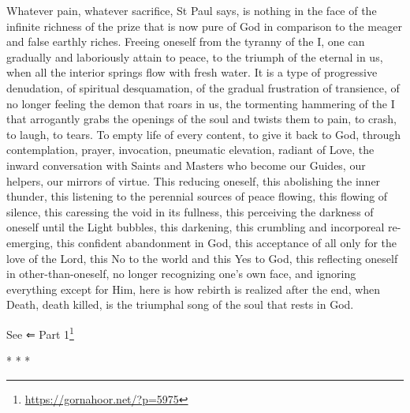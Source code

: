 Whatever pain, whatever sacrifice, St Paul says, is nothing in the face of the infinite richness of the prize that is now pure of God in comparison to the meager and false earthly riches. Freeing oneself from the tyranny of the I, one can gradually and laboriously attain to peace, to the triumph of the eternal in us, when all the interior springs flow with fresh water. It is a type of progressive denudation, of spiritual desquamation, of the gradual frustration of transience, of no longer feeling the demon that roars in us, the tormenting hammering of the I that arrogantly grabs the openings of the soul and twists them to pain, to crash, to laugh, to tears. To empty life of every content, to give it back to God, through contemplation, prayer, invocation, pneumatic elevation, radiant of Love, the inward conversation with Saints and Masters who become our Guides, our helpers, our mirrors of virtue. This reducing oneself, this abolishing the inner thunder, this listening to the perennial sources of peace flowing, this flowing of silence, this caressing the void in its fullness, this perceiving the darkness of oneself until the Light bubbles, this darkening, this crumbling and incorporeal re-emerging, this confident abandonment in God, this acceptance of all only for the love of the Lord, this No to the world and this Yes to God, this reflecting oneself in other-than-oneself, no longer recognizing one's own face, and ignoring everything except for Him, here is how rebirth is realized after the end, when Death, death killed, is the triumphal song of the soul that rests in God.

See ⇐ Part 1\footnote{\url{https://gornahoor.net/?p=5975}}



\begin{center}* * *\end{center}

